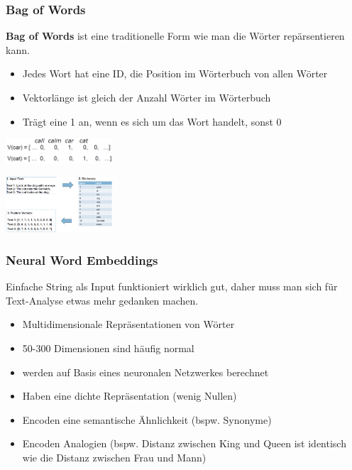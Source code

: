 \documentclass{article}
\newenvironment{Figure}
	{\par\medskip\noindent\minipage{\linewidth}}
	{\endminipage\par\medskip}
\theoremstyle{merke}
\theoremstyle{definition}
\begin{document}
                \subsubsection{Bag of Words}
        \textbf{Bag of Words} ist eine traditionelle Form wie man die Wörter repärsentieren kann.
        \begin{itemize}
            \item Jedes Wort hat eine ID, die Position im Wörterbuch von allen Wörter
            \item Vektorlänge ist gleich der Anzahl Wörter im Wörterbuch
            \item Trägt eine 1 an, wenn es sich um das Wort handelt, sonst 0
        \end{itemize}

        \begin{Figure}
        \centering
        \includegraphics[width=150px]{img/BOW.png}
            \label{fig:Beispiel einer Bag of Words Repräsentation}
        \end{Figure}
        \begin{Figure}
        \centering
        \includegraphics[width=150px]{img/BOW2.png}
            \label{fig:Ablauf einer Bag of Words Repräsentation}
        \end{Figure}

            \subsubsection{Neural Word Embeddings}
            Einfache String als Input funktioniert wirklich gut, daher muss man sich für Text-Analyse etwas mehr gedanken machen. \\
            \begin{itemize}
                \item Multidimensionale Repräsentationen von Wörter
                \item 50-300 Dimensionen sind häufig normal
                \item werden auf Basis eines neuronalen Netzwerkes berechnet
                \item Haben eine dichte Repräsentation (wenig Nullen)
                \item Encoden eine semantische Ähnlichkeit (bspw. Synonyme)
                \item Encoden Analogien (bspw. Distanz zwischen King und Queen ist identisch wie die Distanz zwischen Frau und Mann)
            \end{itemize}
\end{document}
